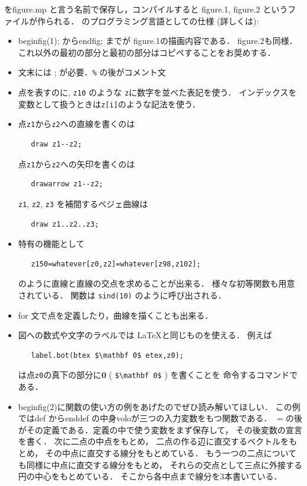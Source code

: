 をfigure.mp と言う名前で保存し，コンパイルすると
figure.1, figure.2 というファイルが作られる．
\MP のプログラミング言語としての仕様
(詳しくは\cite{texlive}):  

\begin{itemize}
   \item
   beginfig(1); からendfig; までが figure.1の描画内容である． 
   figure.2も同様．
   これ以外の最初の部分と最初の部分はコピペすることをお奨めする．
   
   \item
   文末には ; が必要．\verb/%/ の後がコメント文
   
   \item
   点を表すのに, \verb/z10/ のような \verb/z/に数字を並べた表記を使う．
   インデックスを変数として扱うときは\verb/z[i]/のような記法を使う．
   
   \item
   点\verb/z1/から\verb/z2/への直線を書くのは
   \begin{verbatim}
   draw z1--z2;
   \end{verbatim}
   点\verb/z1/から\verb/z2/への矢印を書くのは
   \begin{verbatim}
   drawarrow z1--z2;
   \end{verbatim}
   \verb/z1/, \verb/z2/, \verb/z3/ を補間するベジェ曲線は
   \begin{verbatim}
   draw z1..z2..z3;
   \end{verbatim}
   
   \item
   \MP 特有の機能として
   \begin{verbatim}
   z150=whatever[z0,z2]=whatever[z98,z102];
   \end{verbatim}
   のように直線と直線の交点を求めることが出来る．
   様々な初等関数も用意されている．
   関数は \verb/sind(10)/ のように呼び出される．
   
   \item
   for 文で点を定義したり，曲線を描くことも出来る．
   
   \item
   図への数式や文字のラベルでは \LaTeX と同じものを使える．
   例えば
   \begin{verbatim}
   label.bot(btex $\mathbf 0$ etex,z0);
   \end{verbatim}
   は点\verb/z0/の真下の部分に$\mathbf 0$ ( \verb/$\mathbf 0$/ ) を書くことを
   命令するコマンドである．%
   \item
      beginfig(2)に関数の使い方の例をあげたのでぜひ読み解いてほしい．
      この例ではdef からenddef の中身voloが三つの入力変数をもつ関数である．
      $=$の後がその定義である．定義の中で使う変数をまず保存して，
      その後変数の宣言を書く．
      次に二点の中点をもとめ，
      二点の作る辺に直交するベクトルをもとめ，
      その中点に直交する線分をもとめている．
      もう一つの二点についても同様に中点に直交する線分をもとめ，
      それらの交点として三点に外接する円の中心をもとめている．
      そこから各中点まで線分を3本書いている．
      

\end{itemize}
